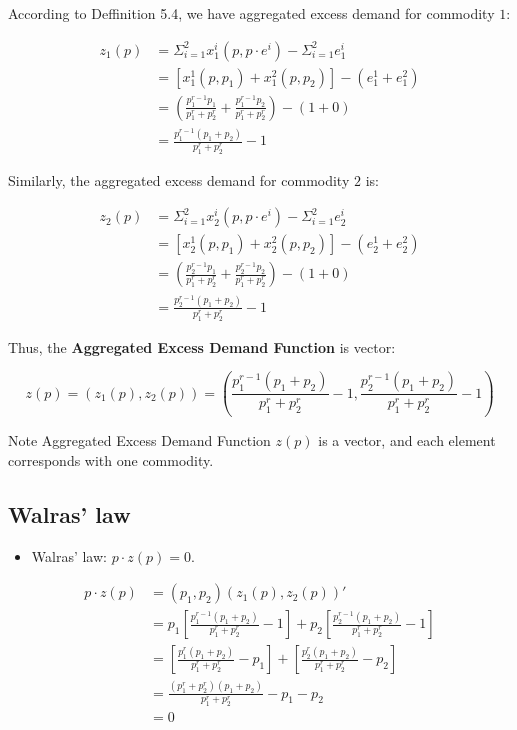 \documentclass{article}
\begin{document}
According to Deffinition 5.4, we have aggregated excess demand for commodity $1$:

\begin{align*}
z_1(p) &= \Sigma_{i=1}^2 x^i_1(p,p\cdot e^i) - \Sigma_{i=1}^2 e^i_1 \\
&= [x^1_1(p,p_1) + x^2_1(p,p_2)] -  (e^1_1+e^2_1) \\
&= ( \frac{p^{r-1}_1 p_1}{p_1^r+p_2^r} + \frac{p^{r-1}_1 p_2}{p_1^r+p_2^r}) - (1+0) \\
&= \frac{p^{r-1}_1 (p_1+p_2)}{p_1^r+p_2^r} -1
\end{align*}

Similarly, the aggregated excess demand for commodity $2$ is:

\begin{align*}
z_2(p) &= \Sigma_{i=1}^2 x^i_2(p,p\cdot e^i) - \Sigma_{i=1}^2 e^i_2 \\
&= [x^1_2(p,p_1) + x^2_2(p,p_2)] -  (e^1_2+e^2_2) \\
&= ( \frac{p^{r-1}_2 p_1}{p_1^r+p_2^r} + \frac{p^{r-1}_2 p_2}{p_1^r+p_2^r}) - (1+0) \\
&= \frac{p^{r-1}_2 (p_1+p_2)}{p_1^r+p_2^r} -1
\end{align*}

Thus, the  \textbf{Aggregated Excess Demand Function} is vector:

$$z(p) = (z_1(p),z_2(p)) = (\frac{p^{r-1}_1 (p_1+p_2)}{p_1^r+p_2^r} -1,\frac{p^{r-1}_2 (p_1+p_2)}{p_1^r+p_2^r} -1)$$


\begin{mdframed}[backgroundcolor=yellow!20,linecolor=white]
Note Aggregated Excess Demand Function $z(p)$ is a vector, and each element corresponds with one commodity.
\end{mdframed}

\subsection{Walras' law}

\begin{mdframed}[backgroundcolor=blue!20,linecolor=white]
\begin{itemize}
\item Walras' law: $p \cdot z(p) = 0$.
\end{itemize}
\end{mdframed}

\begin{align*}
p \cdot z(p) &= (p_1,p_2)(z_1(p),z_2(p))' \\
&= p_1 [\frac{p^{r-1}_1 (p_1+p_2)}{p_1^r+p_2^r} -1] + p_2 [\frac{p^{r-1}_2 (p_1+p_2)}{p_1^r+p_2^r} -1] \\
&= [\frac{p^r_1 (p_1+p_2)}{p_1^r+p_2^r} -p_1] + [\frac{p^{r}_2 (p_1+p_2)}{p_1^r+p_2^r} -p_2]  \\
&= \frac{(p^r_1+p^r_2) (p_1+p_2)}{p_1^r+p_2^r} -p_1 - p_2 \\
&=0
\end{align*}
\end{document}
